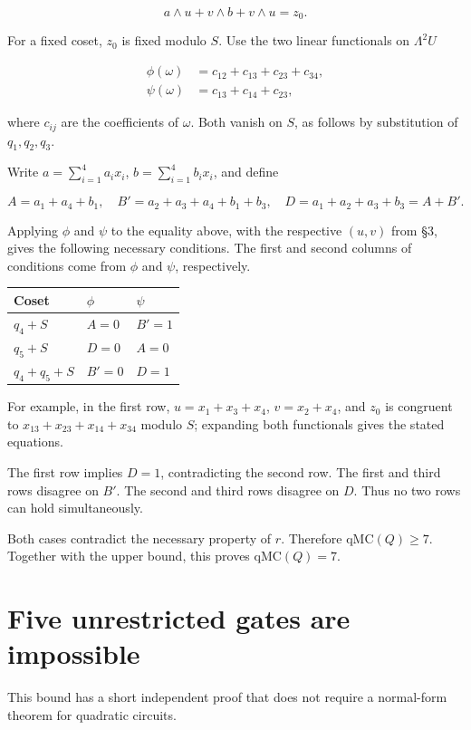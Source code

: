 \[a\wedge u+v\wedge b+v\wedge u=z_0.\]

For a fixed coset, $z_0$ is fixed modulo $S$. Use the two linear functionals on $\Lambda^2 U$

\[\begin{aligned}
\phi(\omega)&=c_{12}+c_{13}+c_{23}+c_{34},\\
\psi(\omega)&=c_{13}+c_{14}+c_{23},
\end{aligned}\]

where $c_{ij}$ are the coefficients of $\omega$. Both vanish on $S$, as follows by substitution of $q_1,q_2,q_3$.

Write $a=\sum_{i=1}^4 a_i x_i$, $b=\sum_{i=1}^4 b_i x_i$, and define

\[A=a_1+a_4+b_1,\quad
B'=a_2+a_3+a_4+b_1+b_3,\quad
D=a_1+a_2+a_3+b_3=A+B'.\]

Applying $\phi$ and $\psi$ to the equality above, with the respective $(u,v)$ from \S{}3, gives the following necessary conditions. The first and second columns of conditions come from $\phi$ and $\psi$, respectively.

\begin{center}\begin{tabular}{lll}\toprule
Coset & $\phi$ & $\psi$\\\midrule
$q_4+S$ & $A=0$ & $B'=1$\\
$q_5+S$ & $D=0$ & $A=0$\\
$q_4+q_5+S$ & $B'=0$ & $D=1$\\
\bottomrule\end{tabular}\end{center}

For example, in the first row, $u=x_1+x_3+x_4$, $v=x_2+x_4$, and $z_0$ is congruent to $x_{13}+x_{23}+x_{14}+x_{34}$ modulo $S$; expanding both functionals gives the stated equations.

The first row implies $D=1$, contradicting the second row. The first and third rows disagree on $B'$. The second and third rows disagree on $D$. Thus no two rows can hold simultaneously.

Both cases contradict the necessary property of $r$. Therefore $\mathrm{qMC}(Q)\ge7$. Together with the upper bound, this proves $\mathrm{qMC}(Q)=7$.

\section{Five unrestricted gates are impossible}

This bound has a short independent proof that does not require a normal-form theorem for quadratic circuits.

